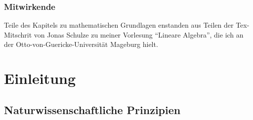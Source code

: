 


\subsection*{Mitwirkende}

Teile des Kapitels zu mathematischen Grundlagen enstanden aus Teilen der Tex-Mitschrit von Jonas Schulze zu meiner Vorlesung ``Lineare Algebra'', die ich an der Otto-von-Guericke-Universität Mageburg hielt. 

\chapter*{Einleitung}

\section{Naturwissenschaftliche Prinzipien}

